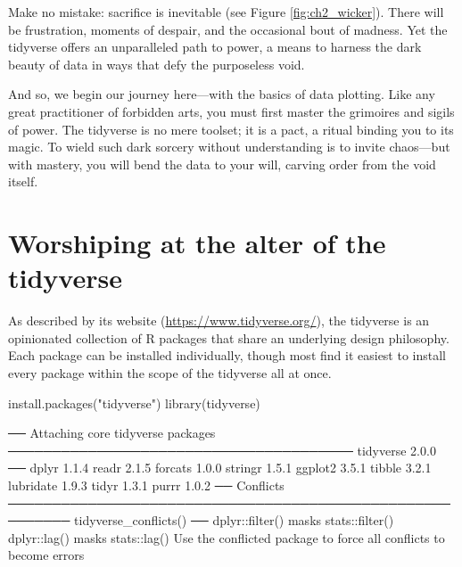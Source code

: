 Make no mistake: sacrifice is inevitable (see Figure \ref{fig:ch2_wicker}). There will be frustration, moments of despair, and the occasional bout of madness. Yet the tidyverse offers an unparalleled path to power, a means to harness the dark beauty of data in ways that defy the purposeless void.

And so, we begin our journey here—with the basics of data plotting. Like any great practitioner of forbidden arts, you must first master the grimoires and sigils of power. The tidyverse is no mere toolset; it is a pact, a ritual binding you to its magic. To wield such dark sorcery without understanding is to invite chaos—but with mastery, you will bend the data to your will, carving order from the void itself.

\normalfont

\section{Worshiping at the alter of the tidyverse}
\label{sec:tidyverse}

As described by its website (\url{https://www.tidyverse.org/}), the \gls{tidyverse} is an opinionated collection of R packages that share an underlying design philosophy. Each package can be installed individually, though most find it easiest to install every package within the scope of the tidyverse all at once.


\begin{inR}
install.packages("tidyverse")
library(tidyverse)
\end{inR}


\begin{outR}
── Attaching core tidyverse packages ─────────────────────────────────────── tidyverse 2.0.0 ──
dplyr     1.1.4     readr     2.1.5
forcats   1.0.0     stringr   1.5.1
ggplot2   3.5.1     tibble    3.2.1
lubridate 1.9.3     tidyr     1.3.1
purrr     1.0.2     
── Conflicts ───────────────────────────────────────────────────────── tidyverse_conflicts() ──
dplyr::filter() masks stats::filter()
dplyr::lag()    masks stats::lag()
Use the conflicted package to force all conflicts to become errors
\end{outR}

